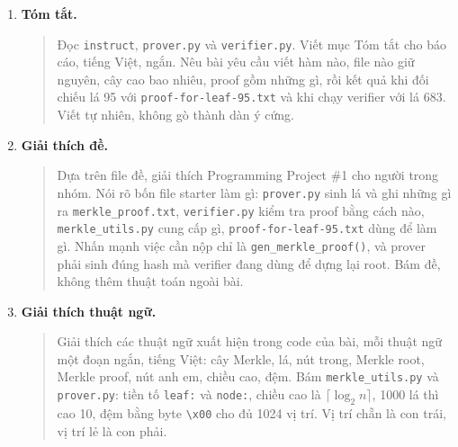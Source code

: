 \documentclass[12pt,a4paper]{article}
\begin{document}
\begin{enumerate}
\item \textbf{Tóm tắt.}
\begin{quote}
Đọc \texttt{instruct}, \texttt{prover.py} và \texttt{verifier.py}. Viết mục Tóm tắt cho báo cáo, tiếng Việt, ngắn. Nêu bài yêu cầu viết hàm nào, file nào giữ nguyên, cây cao bao nhiêu, proof gồm những gì, rồi kết quả khi đối chiếu lá 95 với \texttt{proof-for-leaf-95.txt} và khi chạy verifier với lá 683. Viết tự nhiên, không gò thành dàn ý cứng.
\end{quote}

\item \textbf{Giải thích đề.}
\begin{quote}
Dựa trên file đề, giải thích Programming Project \#1 cho người trong nhóm. Nói rõ bốn file starter làm gì: \texttt{prover.py} sinh lá và ghi những gì ra \texttt{merkle\_proof.txt}, \texttt{verifier.py} kiểm tra proof bằng cách nào, \texttt{merkle\_utils.py} cung cấp gì, \texttt{proof-for-leaf-95.txt} dùng để làm gì. Nhấn mạnh việc cần nộp chỉ là \texttt{gen\_merkle\_proof()}, và prover phải sinh đúng hash mà verifier đang dùng để dựng lại root. Bám đề, không thêm thuật toán ngoài bài.
\end{quote}

\item \textbf{Giải thích thuật ngữ.}
\begin{quote}
Giải thích các thuật ngữ xuất hiện trong code của bài, mỗi thuật ngữ một đoạn ngắn, tiếng Việt: cây Merkle, lá, nút trong, Merkle root, Merkle proof, nút anh em, chiều cao, đệm. Bám \texttt{merkle\_utils.py} và \texttt{prover.py}: tiền tố \texttt{leaf:} và \texttt{node:}, chiều cao là \(\lceil \log_2 n \rceil\), 1000 lá thì cao 10, đệm bằng byte \texttt{\textbackslash x00} cho đủ 1024 vị trí. Vị trí chẵn là con trái, vị trí lẻ là con phải.
\end{quote}
\end{enumerate}
\end{document}
